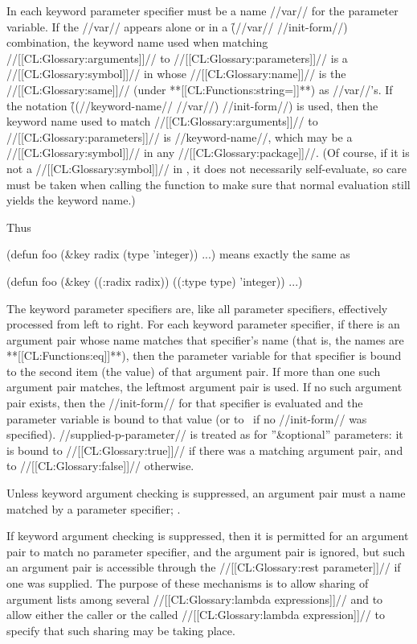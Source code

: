 In each keyword parameter specifier must be a name //var// for the parameter variable.  If the //var// appears alone or in a \f{(//var// //init-form//)} combination, the keyword name used when matching //[[CL:Glossary:arguments]]// to //[[CL:Glossary:parameters]]// is a //[[CL:Glossary:symbol]]// in  whose //[[CL:Glossary:name]]// is the //[[CL:Glossary:same]]// (under **[[CL:Functions:string=]]**) as //var//'s. If the notation \f{((//keyword-name// //var//) //init-form//)} is used, then the keyword name used to match //[[CL:Glossary:arguments]]// to //[[CL:Glossary:parameters]]// is //keyword-name//, which may be a //[[CL:Glossary:symbol]]// in any //[[CL:Glossary:package]]//. (Of course, if it is not a //[[CL:Glossary:symbol]]// in , it does not necessarily self-evaluate, so care must be taken when calling the function to make sure that normal evaluation still yields the keyword name.)

Thus

\code
 (defun foo (&key radix (type 'integer)) ...) \endcode means exactly the same as

\code
 (defun foo (&key ((:radix radix)) ((:type type) 'integer)) ...) \endcode

The keyword parameter specifiers are, like all parameter specifiers, effectively processed from left to right.  For each keyword parameter specifier, if there is an argument pair whose name matches that specifier's name (that is, the names are **[[CL:Functions:eq]]**), then the parameter variable for that specifier is bound to the second item (the value) of that argument pair.  If more than one such argument pair matches, the leftmost argument pair is used.  If no such argument pair exists, then the //init-form// for that specifier is evaluated and the parameter variable is bound to that value (or to \nil\ if no //init-form// was specified).  //supplied-p-parameter// is treated as for ''&optional'' parameters: it is bound to //[[CL:Glossary:true]]// if there was a matching argument pair, and to //[[CL:Glossary:false]]// otherwise.

Unless keyword argument checking is suppressed, an argument pair must a name matched by a parameter specifier; \seesection\UnrecognizedKeyArgs.

If keyword argument checking is suppressed,  then it is permitted for an argument pair to match no parameter specifier, and the argument pair is ignored, but such an argument pair is accessible through the //[[CL:Glossary:rest parameter]]// if one was supplied.  The purpose of these mechanisms is to allow sharing of argument lists among several //[[CL:Glossary:lambda expressions]]// and to allow either the caller or the called //[[CL:Glossary:lambda expression]]// to specify that such sharing may be taking place.

